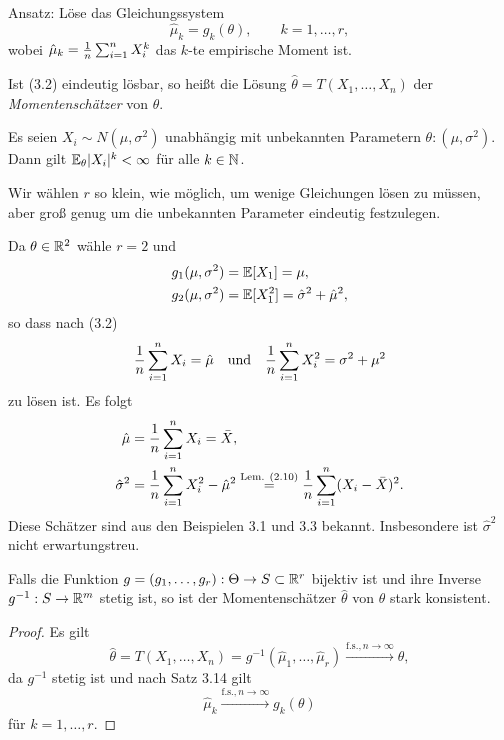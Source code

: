 Ansatz: Löse das Gleichungssystem
\begin{equation} %
  \hat{\mu}_k = g_k( \theta ), \qquad k = 1, \ldots, r,
\end{equation}
wobei $\hat{\mu}_k = \frac{1}{n} \sum_{i=1}^n X_i^k$ das $k$-te empirische Moment
ist.

\begin{defn} %
  Ist (3.2) eindeutig lösbar, so heißt die Lösung $\hat{\theta} = T(X_1, \ldots,
  X_n)$ der \emph{Momentenschätzer} von $\theta$.
\end{defn}

\begin{exmp} %
  Es seien $X_i \sim N(\mu, \sigma^2)$ unabhängig mit unbekannten Parametern
  $\theta:(\mu, \sigma^2)$. Dann gilt $\mathbb{E}_\theta | X_i |^k < \infty$ für alle
  $k \in \mathbb{N}$.

  Wir wählen $r$ so klein, wie möglich, um wenige Gleichungen lösen zu müssen,
  aber groß genug um die unbekannten Parameter eindeutig festzulegen.

  Da $\theta \in \mathbb{R}^2$ wähle $r = 2$ und
  \begin{align*}
    g_1( \mu, \sigma^2) &= \mathbb{E}[X_1] = \mu, \\
    g_2( \mu, \sigma^2) &= \mathbb{E}[X_1^2] = \hat{\sigma}^2 + \hat{\mu}^2,
  \end{align*}
  so dass nach (3.2)
  \[ \frac{1}{n} \sum_{i=1}^n X_i = \hat{\mu} \quad \text{und} \quad \frac{1}{n}
    \sum_{i=1}^n X_i^2 = \sigma^2 + \mu^2 \]
  zu lösen ist. Es folgt
  \[ \begin{aligned}
      \hat{\mu} &= \frac{1}{n} \sum_{i=1}^n X_i = \bar{X}, \\
      \hat{\sigma}^2 &= \frac{1}{n} \sum_{i=1}^n X_i^2 - \hat{\mu}^2
      \overset{\text{Lem. } (2.10)}{=} \frac{1}{n} \sum_{i=1}^n (X_i - \bar{X})^2.
    \end{aligned}
  \]
  Diese Schätzer sind aus den Beispielen 3.1 und 3.3 bekannt. Insbesondere ist
  $\hat{\sigma}^2$ nicht erwartungstreu.
\end{exmp}

\begin{lem} %
  Falls die Funktion $g = (g_1, \ldots, g_r) : \Theta \to S \subset \mathbb{R}^r$
  bijektiv ist und ihre Inverse $g^{-1}: S \to \mathbb{R}^m$ stetig ist, so ist der
  Momentenschätzer $\hat{\theta}$ von $\theta$ stark konsistent.
\end{lem}

\begin{proof}
  Es gilt
  \[ \hat{\theta} = T(X_1, \ldots, X_n) = g^{-1}( \hat{\mu}_1, \ldots,
    \hat{\mu}_r ) \xrightarrow{\text{f.s.}, n \to \infty} \theta, \]
  da $g^{-1}$ stetig ist und nach Satz 3.14 gilt
  \[ \hat{\mu}_k \xrightarrow{\text{f.s.}, n \to \infty} g_k(\theta) \]
  für $k = 1, \ldots, r$.
\end{proof}

